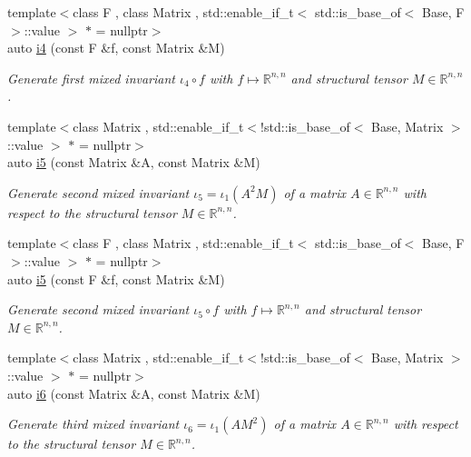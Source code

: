 \begin{DoxyCompactItemize}
{\footnotesize template$<$class F , class Matrix , std\+::enable\+\_\+if\+\_\+t$<$ std\+::is\+\_\+base\+\_\+of$<$ Base, F $>$\+::value $>$ $\ast$  = nullptr$>$ }\\auto \hyperlink{group__InvariantGroup_ga0df96cdb1e4b8b5a040f2adc97c51100}{i4} (const F \&f, const Matrix \&M)
\begin{DoxyCompactList}\small\item\em Generate first mixed invariant $ \iota_4\circ f $ with $f\mapsto\mathbb{R}^{n,n}$ and structural tensor $M\in\mathbb{R}^{n,n}$. \end{DoxyCompactList}\item 
{\footnotesize template$<$class Matrix , std\+::enable\+\_\+if\+\_\+t$<$!std\+::is\+\_\+base\+\_\+of$<$ Base, Matrix $>$\+::value $>$ $\ast$  = nullptr$>$ }\\auto \hyperlink{group__InvariantGroup_gabedc42182203d883278e29fd16b355a0}{i5} (const Matrix \&A, const Matrix \&M)
\begin{DoxyCompactList}\small\item\em Generate second mixed invariant $ \iota_5=\iota_1(A^2M) $ of a matrix $A\in\mathbb{R}^{n,n}$ with respect to the structural tensor $M\in\mathbb{R}^{n,n}$. \end{DoxyCompactList}\item 
{\footnotesize template$<$class F , class Matrix , std\+::enable\+\_\+if\+\_\+t$<$ std\+::is\+\_\+base\+\_\+of$<$ Base, F $>$\+::value $>$ $\ast$  = nullptr$>$ }\\auto \hyperlink{group__InvariantGroup_gaed7e47c39d89f2b01e25c992da78b44d}{i5} (const F \&f, const Matrix \&M)
\begin{DoxyCompactList}\small\item\em Generate second mixed invariant $ \iota_5\circ f $ with $f\mapsto\mathbb{R}^{n,n}$ and structural tensor $M\in\mathbb{R}^{n,n}$. \end{DoxyCompactList}\item 
{\footnotesize template$<$class Matrix , std\+::enable\+\_\+if\+\_\+t$<$!std\+::is\+\_\+base\+\_\+of$<$ Base, Matrix $>$\+::value $>$ $\ast$  = nullptr$>$ }\\auto \hyperlink{group__InvariantGroup_gad9f0627946667bb052212f65ecdd002b}{i6} (const Matrix \&A, const Matrix \&M)
\begin{DoxyCompactList}\small\item\em Generate third mixed invariant $ \iota_6=\iota_1(AM^2) $ of a matrix $A\in\mathbb{R}^{n,n}$ with respect to the structural tensor $M\in\mathbb{R}^{n,n}$. \end{DoxyCompactList}\item 

\end{DoxyCompactItemize}
